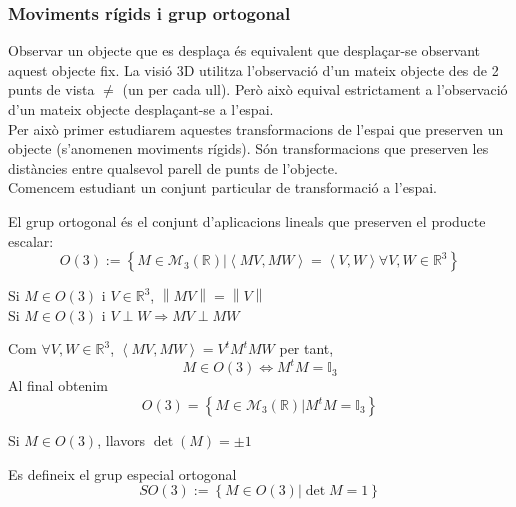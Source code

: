 \documentclass[../main.tex]{subfiles}
\begin{document}
\subsubsection{Moviments rígids i grup ortogonal}
Observar un objecte que es desplaça és equivalent que desplaçar-se observant aquest objecte fix.
La visió 3D utilitza l'observació d'un mateix objecte des de 2 punts de vista $\neq$ (un per cada
ull). Però això equival estrictament a l'observació d'un mateix objecte desplaçant-se a l'espai.\\
Per això primer estudiarem aquestes transformacions de l'espai que preserven un objecte (s'anomenen
moviments rígids). Són transformacions que preserven les distàncies entre qualsevol parell de punts
de l'objecte.\\
Comencem estudiant un conjunt particular de transformació a l'espai.
\begin{definicio}
    El grup ortogonal és el conjunt d'aplicacions lineals que preserven el producte escalar:
    \begin{displaymath}
        O(3) := \left\{M \in \mathcal{M}_3\left(\mathbb{R}\right) | \left\langle MV, MW \right\rangle = \left\langle V, W\right\rangle \forall V, W \in \mathbb{R}^3 \right\} 
    \end{displaymath}
\end{definicio}
\begin{obs}
    Si $M \in O(3)$ i $V \in \mathbb{R}^3$, $\left\lVert MV\right\rVert = \left\lVert V\right\rVert$\\
    Si $M\in O(3)$ i $V\perp W \Rightarrow MV \perp MW$
\end{obs}
Com $\forall V, W \in \mathbb{R}^3$, $\left\langle MV, MW\right\rangle = V^tM^tMW$ per tant,
\begin{displaymath}
    M \in O(3) \Leftrightarrow M^tM = \mathbb{I}_3  
\end{displaymath}
Al final obtenim
\begin{displaymath}
    O(3) = \left\{M \in \mathcal{M}_3\left(\mathbb{R}\right) | M^tM = \mathbb{I}_3\right\}
\end{displaymath}
\begin{proposicio}
    Si $M \in O(3)$, llavors $\det\left(M\right) = \pm 1$
\end{proposicio}
\begin{definicio}
    Es defineix el grup especial ortogonal
    \begin{displaymath}
        SO(3) := \left\{M \in O(3) | \det{M} = 1\right\} 
    \end{displaymath}
\end{definicio}
\end{document}
